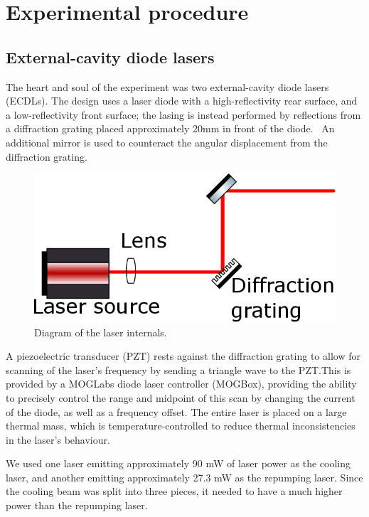 \documentclass[11pt,twoside,a4paper]{article}
\begin{document}
\section{Experimental procedure}
\subsection{External-cavity diode lasers}
The heart and soul of the experiment was two external-cavity diode lasers (ECDLs). The design uses a laser diode
with a high-reflectivity rear surface, and a low-reflectivity front surface; the lasing is instead performed by reflections
from a diffraction grating placed approximately 20mm in front of the diode.~\cite{moglabsecd} An additional mirror is used to counteract
the angular displacement from the diffraction grating.
\begin{figure}[h]
    \centering
    \includegraphics[width=.3\textwidth]{images/ecdl-internals.png}
    \caption{Diagram of the laser internals.}
\end{figure}

A piezoelectric transducer (PZT) rests against the diffraction grating to allow for scanning of the laser's frequency by sending a
triangle wave to the PZT.\@ This is provided by a MOGLabs diode laser controller (MOGBox), providing the ability to precisely control the range
and midpoint of this scan by changing the current of the diode, as well as a frequency offset. The entire laser is placed on a large thermal mass,
which is temperature-controlled to reduce thermal inconsistencies in the laser's behaviour.

We used one laser emitting approximately 90 mW of laser power as the cooling laser, and another emitting approximately 27.3 mW as the
repumping laser. Since the cooling beam was split into three pieces, it needed to have a much higher power than the repumping laser.
\end{document}
